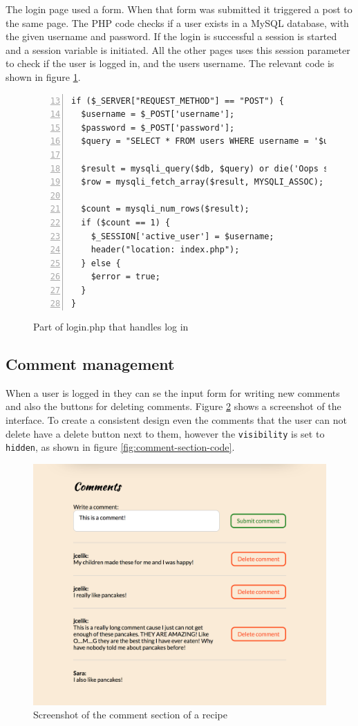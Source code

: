 \documentclass[a4paper]{scrartcl}
\begin{document}
The login page used a form. When that form was submitted it triggered a post to the same page. The PHP code checks if a user exists in a MySQL database, with the given username and password. If the login is successful a session is started and a session variable is initiated. All the other pages uses this session parameter to check if the user is logged in, and the users username. The relevant code is shown in figure \ref{fig:login-code}.

\begin{figure}
\begin{lstlisting}[frame=single, numbers=left, breaklines=true, basicstyle=\ttfamily\footnotesize, firstnumber=13]
if ($_SERVER["REQUEST_METHOD"] == "POST") {
  $username = $_POST['username'];
  $password = $_POST['password'];
  $query = "SELECT * FROM users WHERE username = '$username' and password = '$password'";
	
  $result = mysqli_query($db, $query) or die('Oops something broke! Please try again at a later time.');
  $row = mysqli_fetch_array($result, MYSQLI_ASSOC);
  
  $count = mysqli_num_rows($result);
  if ($count == 1) {
    $_SESSION['active_user'] = $username;
    header("location: index.php");
  } else {
    $error = true;
  }
}
\end{lstlisting}
\caption{Part of login.php that handles log in}
\label{fig:login-code}
\end{figure}

\subsection{Comment management}
\label{result:comments}
When a user is logged in they can se the input form for writing new comments and also the buttons for deleting comments. Figure \ref{fig:comment-section} shows a screenshot of the interface. To create a consistent design even the comments that the user can not delete have a delete button next to them, however the \texttt{visibility} is set to \texttt{hidden}, as shown in figure \ref{fig:comment-section-code}.

\begin{figure}
	\begin{center}
		\includegraphics[width=0.7\linewidth]{images/screenshot-comment.png}
		\caption{Screenshot of the comment section of a recipe}
		\label{fig:comment-section}
	\end{center}
\end{figure}
\end{document}
